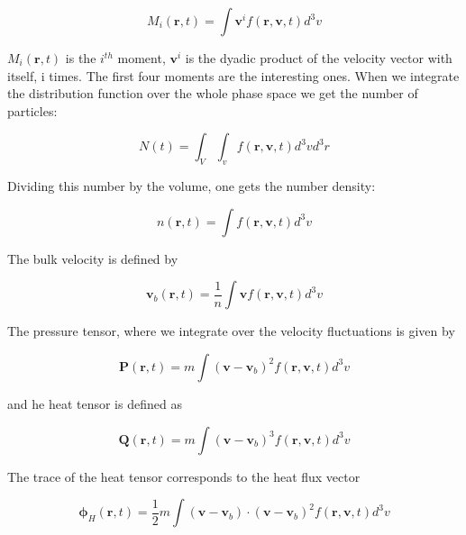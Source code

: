 \documentclass[a4paper,11pt]{thesis}
\begin{document}
\begin{equation}\label{velocity_moment_allgemein}
M_i(\mathbf{r},t)=\int \mathbf{v}^i f(\mathbf{r,v},t)d^3v
\end{equation}

$M_i(\mathbf{r},t)$ is the $i^{th}$ moment, $\mathbf{v}^i$ is the dyadic product of the velocity vector with
itself, i times. The first four moments are the interesting ones.
When we integrate the distribution function over the whole phase
space we get the number of particles:

 \begin{equation}\label{particle number}
 N(t)=\int_V \int_v f(\mathbf{r,v},t)d^3v d^3r
 \end{equation}

 Dividing this number by the volume, one gets the number density:

\begin{equation}
\label{velocity_moment_number_density}
n(\mathbf{r},t)=\int
f(\mathbf{r,v},t)d^3v
\end{equation}

The bulk velocity is defined by

\begin{equation}\label{velocity_moment_bulc_velocity}
\mathbf{v}_b(\mathbf{r},t)=\frac{1}{n}\int \mathbf{v}
f(\mathbf{r,v},t)d^3v
\end{equation}

The pressure tensor, where we integrate over the velocity fluctuations is given by

\begin{equation}\label{velocity_moment_pressure}
\mathbf{P}(\mathbf{r},t)=m\int (\mathbf{v}-\mathbf{v}_b)^2
f(\mathbf{r,v},t)d^3v
\end{equation}

and he heat tensor is defined as

\begin{equation}\label{velocity_moment_heat_tensor}
\mathbf{Q}(\mathbf{r},t)=m\int (\mathbf{v}-\mathbf{v}_b)^3
f(\mathbf{r,v},t)d^3v
\end{equation}

The trace of the heat tensor corresponds to the heat flux vector

\begin{equation}\label{heat_flux}
\mathbf{\phi}_H(\mathbf{r},t)=\frac{1}{2} m\int
(\mathbf{v}-\mathbf{v}_b)\cdot(\mathbf{v}-\mathbf{v}_b)^2
f(\mathbf{r,v},t)d^3v
\end{equation}
\end{document}

